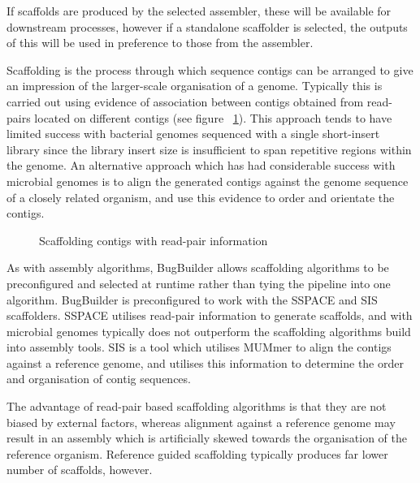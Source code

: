 \documentclass[a4paper,twoside,10pt]{article}
\begin{document}
If scaffolds are produced by the selected assembler, these will be available for downstream
processes, however if a standalone scaffolder is selected, the outputs of this will be used in
preference to those from the assembler. 

Scaffolding is the process through which sequence contigs can be arranged to give an impression of
the larger-scale organisation of a genome. Typically this is carried out using evidence of
association between contigs obtained from read-pairs located on different contigs (see figure
~\ref{fig:ReadPairScaffolding}). This approach tends to have limited success with bacterial genomes
sequenced with a single short-insert library since the library insert size is insufficient to span
repetitive regions within the genome. An alternative approach which has had considerable success
with microbial genomes is to align the generated contigs against the genome sequence of a closely
related organism, and use this evidence to order and orientate the contigs.

\begin{figure}[h]
\caption{Scaffolding contigs with read-pair information}
\label{fig:ReadPairScaffolding}
\end{figure}

As with assembly algorithms, BugBuilder allows scaffolding algorithms to be preconfigured and
selected at runtime rather than tying the pipeline into one algorithm. BugBuilder is preconfigured
to work with the SSPACE and SIS scaffolders. SSPACE utilises read-pair information to generate
scaffolds, and with microbial genomes typically does not outperform the scaffolding algorithms
build into assembly tools. SIS is a tool which utilises MUMmer to align the contigs against a
reference genome, and utilises this information to determine the order and organisation of contig
sequences.  

The advantage of read-pair based scaffolding algorithms is that they are not biased by external
factors, whereas alignment against a reference genome may result in an assembly which is
artificially skewed towards the organisation of the reference organism. Reference guided
scaffolding typically produces far lower number of scaffolds, however.
\end{document}
